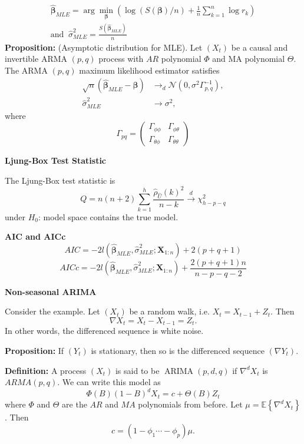 \documentclass[a4paper]{article}
\newcommand{\subheading}[1]{{\scriptsize\textbf{#1}}}
\begin{document}
\begin{multicols*}{4}
$$
\begin{gathered}
\hat{\boldsymbol{\beta}}_{M L E}=\arg \min _{\boldsymbol{\beta}}\left(\log (S(\boldsymbol{\beta}) / n)+\frac{1}{n} \sum_{k=1}^{n} \log r_{k}\right)\\
\text{and} \;\; \hat{\sigma}_{M L E}^{2}=\frac{S\left(\hat{\boldsymbol{\beta}}_{M L E}\right)}{n}
\end{gathered}
$$
\textbf{Proposition:} (Asymptotic distribution for MLE). 
Let $\left(X_{t}\right)$ be a causal and invertible ARMA $(p, q)$ process with $A R$ polynomial $\Phi$ and MA polynomial $\Theta$. The ARMA $(p, q)$ maximum likelihood estimator satisfies
$$
\begin{aligned}
\sqrt{n}\left(\hat{\boldsymbol{\beta}}_{M L E}-\boldsymbol{\beta}\right) & \rightarrow_{d} \mathcal{N}\left(0, \sigma^{2} \Gamma_{p, q}^{-1}\right), \\
\hat{\sigma}_{M L E}^{2} & \rightarrow \sigma^{2},
\end{aligned}
$$
where
$$
\Gamma_{p q}=\left(\begin{array}{cc}
\Gamma_{\phi \phi} & \Gamma_{\phi \theta} \\
\Gamma_{\theta \phi} & \Gamma_{\theta \theta}
\end{array}\right)
$$

\smallskip
\hline
\smallskip

\subheading{Ljung-Box Test Statistic}

The Ljung-Box test statistic is
$$
Q=n(n+2) \sum_{k=1}^{h} \frac{\hat{\rho}_{\hat{U}}(k)^{2}}{n-k} \overset{d}{\rightarrow} \chi_{h-p-q}^{2}
$$
under $H_0$: model space contains the true model.

\subheading{AIC and AICc}
$$
AIC=-2 l\left(\hat{\boldsymbol{\beta}}_{M L E}, \hat{\sigma}_{M L E}^{2} ; \mathbf{X}_{1: n}\right)+2(p+q+1)
$$
$$
AICc=-2 l\left(\hat{\boldsymbol{\beta}}_{M L E}, \hat{\sigma}_{M L E}^{2} ; \mathbf{X}_{1: n}\right)+\frac{2(p+q+1) n}{n-p-q-2}
$$

\smallskip
\hline
\smallskip

\subheading{Non-seasonal ARIMA}

Consider the example. Let $\left(X_{t}\right)$ be a random walk, i.e. $X_{t}=X_{t-1}+Z_{t}$. Then
$$
\nabla X_{t}=X_{t}-X_{t-1}=Z_{t}.
$$
In other words, the differenced sequence is white noise.

\textbf{Proposition:} If $\left(Y_{t}\right)$ is stationary, then so is the differenced sequence $\left(\nabla Y_{t}\right)$.

\textbf{Definition:} A process $\left(X_{t}\right)$ is said to be $\operatorname{ARIMA}(p, d, q)$ if $\nabla^{d} X_{t}$ is $A R M A(p, q)$. We can write this model as
$$
\Phi(B)(1-B)^{d} X_{t}=c+\Theta(B) Z_{t}
$$
where $\Phi$ and $\Theta$ are the $A R$ and $M A$ polynomials from before.
Let $\mu=\mathbb{E}\left\{\nabla^{d} X_{t}\right\}$. Then
$$
c=\left(1-\phi_{1} \cdots-\phi_{p}\right) \mu .
$$


\end{multicols*}
\end{document}
